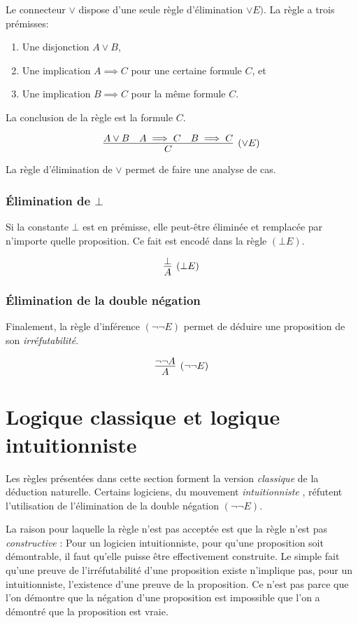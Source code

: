 Le connecteur ${\vee}$ dispose d'une seule règle d'élimination ${\vee}E)$.
La règle a trois prémisses:
\begin{enumerate}
\item
Une disjonction $A \vee B$,
\item
Une implication $A \implies C$ pour une certaine formule $C$, et
\item
Une implication $B \implies C$ pour la même formule $C$.
\end{enumerate}
La conclusion de la règle est la formule $C$.

\[
\infer[({\vee}E)]{C}{A \vee B & A \implies C & B \implies C}
\]

La règle d'élimination de ${\vee}$ permet de faire une analyse de cas.


\subsubsection{Élimination de $\bot$}

Si la constante $\bot$ est en prémisse, elle peut-être éliminée et remplacée par n'importe quelle proposition.
Ce fait est encodé dans la règle $({\bot}E)$.

\[
\infer[({\bot}E)]{A}{\bot}
\]

\subsubsection{Élimination de la double négation}

Finalement, la règle d'inférence $({\neg}{\neg}E)$ permet de déduire une proposition de son \textit{irréfutabilité}.

\[
\infer[({\neg}{\neg}E)]{A}{\neg \neg A}
\]

\section{Logique classique et logique intuitionniste}

Les règles présentées dans cette section forment la version \og \textit{classique} \fg{} de la déduction naturelle.
Certains logiciens, du mouvement \og \textit{intuitionniste} \fg{}, réfutent l'utilisation de l'élimination de la double négation $({\neg}{\neg}E)$.

La raison pour laquelle la règle n'est pas acceptée est que la règle n'est pas \og \textit{constructive} \fg{}:
Pour un logicien intuitionniste, pour qu'une proposition soit démontrable, il faut qu'elle puisse être effectivement construite.
Le simple fait qu'une preuve de l'irréfutabilité d'une proposition existe n'implique pas, pour un intuitionniste, l'existence d'une preuve de la proposition. Ce n'est pas parce que l'on démontre que la négation d'une proposition est impossible que l'on a démontré que la proposition est vraie.

